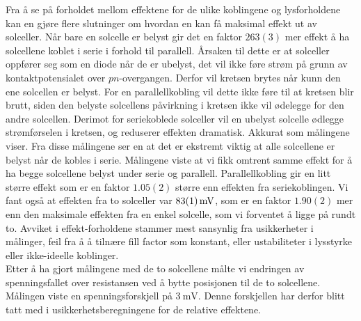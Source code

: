 \documentclass[%
 reprint,
 amsmath,amssymb,
 aps,
 norsk,
 booktabs
]{revtex4-1}
\begin{document}
Fra å se på forholdet mellom effektene for de ulike koblingene og lysforholdene kan en gjøre flere slutninger om hvordan en kan få maksimal effekt ut av solceller. Når bare en solcelle er belyst gir det en faktor $263(3)$ mer effekt å ha solcellene koblet i serie i forhold til parallell. Årsaken til dette er at solceller oppfører seg som en diode når de er ubelyst, det vil ikke føre strøm på grunn av kontaktpotensialet over $pn$-overgangen. Derfor vil kretsen brytes når kunn den ene solcellen er belyst. For en parallellkobling vil dette ikke føre til at kretsen blir brutt, siden den belyste solcellens påvirkning i kretsen ikke vil ødelegge for den andre solcellen. Derimot for seriekoblede solceller vil en ubelyst solcelle ødlegge strømførselen i kretsen, og reduserer effekten dramatisk. Akkurat som målingene viser. Fra disse målingene ser en at det er ekstremt viktig at alle solcellene er belyst når de kobles i serie. Målingene viste at vi fikk omtrent samme effekt for å ha begge solcellene belyst under serie og parallell. Parallellkobling gir en litt større effekt som er en faktor $1.05(2)$ større enn effekten fra seriekoblingen. Vi fant også at effekten fra to solceller var $\SI{83\pm1}{\milli\volt}$, som er en faktor $1.90(2)$ mer enn den maksimale effekten fra en enkel solcelle, som vi forventet å ligge på rundt to. Avviket i effekt-forholdene stammer mest sansynlig fra usikkerheter i målinger, feil fra å å tilnære fill factor som konstant, eller ustabiliteter i lysstyrke eller ikke-ideelle koblinger.\\
Etter å ha gjort målingene med de to solcellene målte vi endringen av spenningsfallet over resistansen ved å bytte posisjonen til de to solcellene. Målingen viste en spenningsforskjell på $\SI{3}{\milli\volt}$. Denne forskjellen har derfor blitt tatt med i usikkerhetsberegningene for de relative effektene.
\end{document}
